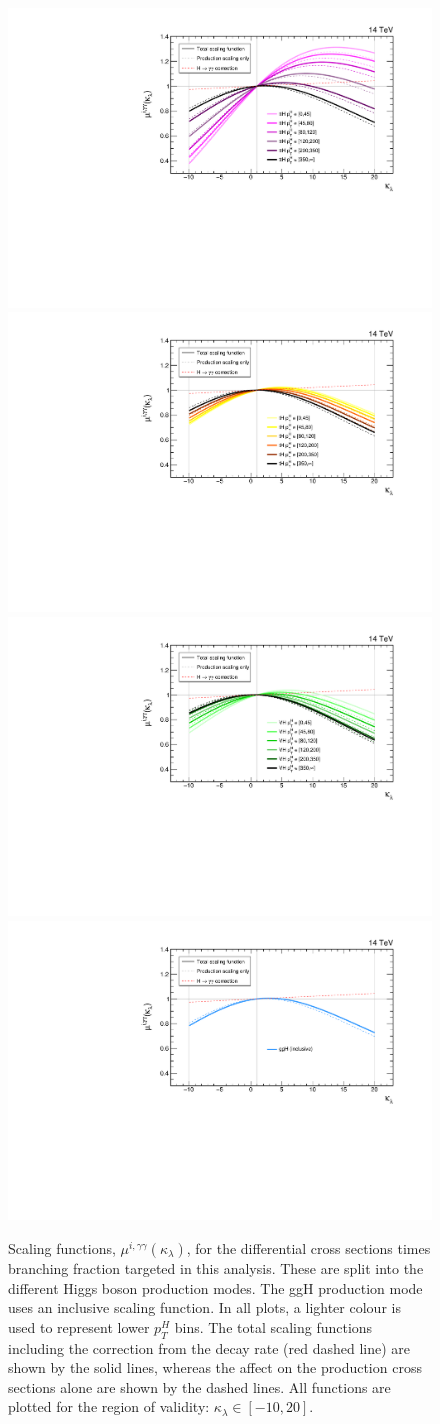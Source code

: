\begin{figure}[t!]
  \centering
  \includegraphics[width=.49\textwidth]{Figures/cms/trilinear/ttH.pdf}
  \includegraphics[width=.49\textwidth]{Figures/cms/trilinear/tH.pdf}
  \includegraphics[width=.49\textwidth]{Figures/cms/trilinear/VH.pdf}
  \includegraphics[width=.49\textwidth]{Figures/cms/trilinear/ggH.pdf}
  \caption[Scaling functions in terms of $\kappa_\lambda$]
  {
    Scaling functions, $\mu^{i,\gamma\gamma}(\kappa_\lambda)$, for the differential cross sections times branching fraction targeted in this analysis. These are split into the different Higgs boson production modes. The ggH production mode uses an inclusive scaling function. In all plots, a lighter colour is used to represent lower $p_T^H$ bins. The total scaling functions including the correction from the \Hgg decay rate (red dashed line) are shown by the solid lines, whereas the affect on the production cross sections alone are shown by the dashed lines. All functions are plotted for the region of validity: $\kappa_\lambda \in [-10,20]$.
  }
  \label{fig:trilinear_sf}
\end{figure}

